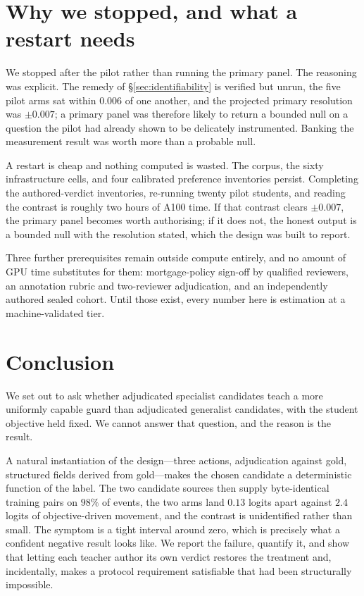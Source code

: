 \documentclass[10pt]{article}
\begin{document}
\section{Why we stopped, and what a restart needs}

We stopped after the pilot rather than running the primary panel. The reasoning was
explicit. The remedy of \S\ref{sec:identifiability} is verified but unrun, the five
pilot arms sat within $0.006$ of one another, and the projected primary resolution was
$\pm 0.007$; a primary panel was therefore likely to return a bounded null on a
question the pilot had already shown to be delicately instrumented. Banking the
measurement result was worth more than a probable null.

A restart is cheap and nothing computed is wasted. The corpus, the sixty infrastructure
cells, and four calibrated preference inventories persist. Completing the authored-verdict
inventories, re-running twenty pilot students, and reading the contrast is roughly two
hours of A100 time. If that contrast clears $\pm 0.007$, the primary panel becomes
worth authorising; if it does not, the honest output is a bounded null with the
resolution stated, which the design was built to report.

Three further prerequisites remain outside compute entirely, and no amount of GPU time
substitutes for them: mortgage-policy sign-off by qualified reviewers, an annotation
rubric and two-reviewer adjudication, and an independently authored sealed cohort. Until
those exist, every number here is estimation at a machine-validated tier.

\section{Conclusion}

We set out to ask whether adjudicated specialist candidates teach a more uniformly
capable guard than adjudicated generalist candidates, with the student objective held
fixed. We cannot answer that question, and the reason is the result.

A natural instantiation of the design---three actions, adjudication against gold,
structured fields derived from gold---makes the chosen candidate a deterministic
function of the label. The two candidate sources then supply byte-identical training
pairs on $98\%$ of events, the two arms land $0.13$ logits apart against $2.4$ logits of
objective-driven movement, and the contrast is unidentified rather than small. The
symptom is a tight interval around zero, which is precisely what a confident negative
result looks like. We report the failure, quantify it, and show that letting each
teacher author its own verdict restores the treatment and, incidentally, makes a
protocol requirement satisfiable that had been structurally impossible.
\end{document}
